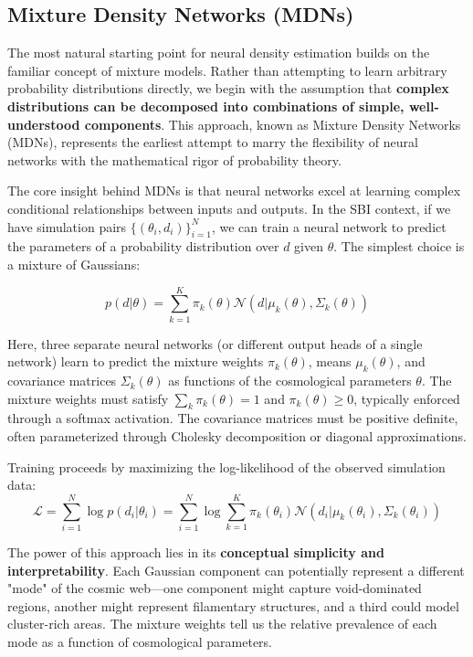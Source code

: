 \documentclass{SciPost}
\begin{document}
\subsection{Mixture Density Networks (MDNs)}

The most natural starting point for neural density estimation builds on the familiar concept of mixture models. Rather than attempting to learn arbitrary probability distributions directly, we begin with the assumption that \textbf{complex distributions can be decomposed into combinations of simple, well-understood components}. This approach, known as Mixture Density Networks (MDNs), represents the earliest attempt to marry the flexibility of neural networks with the mathematical rigor of probability theory.

The core insight behind MDNs is that neural networks excel at learning complex conditional relationships between inputs and outputs. In the SBI context, if we have simulation pairs $\{(\theta_i, d_i)\}_{i=1}^N$, we can train a neural network to predict the parameters of a probability distribution over $d$ given $\theta$. The simplest choice is a mixture of Gaussians:

\begin{equation}
    p(d|\theta) = \sum_{k=1}^K \pi_k(\theta) \mathcal{N}(d | \mu_k(\theta), \Sigma_k(\theta))
\end{equation}

Here, three separate neural networks (or different output heads of a single network) learn to predict the mixture weights $\pi_k(\theta)$, means $\mu_k(\theta)$, and covariance matrices $\Sigma_k(\theta)$ as functions of the cosmological parameters $\theta$. The mixture weights must satisfy $\sum_k \pi_k(\theta) = 1$ and $\pi_k(\theta) \geq 0$, typically enforced through a softmax activation. The covariance matrices must be positive definite, often parameterized through Cholesky decomposition or diagonal approximations.

Training proceeds by maximizing the log-likelihood of the observed simulation data:
\begin{equation}
    \mathcal{L} = \sum_{i=1}^N \log p(d_i|\theta_i) = \sum_{i=1}^N \log \sum_{k=1}^K \pi_k(\theta_i) \mathcal{N}(d_i | \mu_k(\theta_i), \Sigma_k(\theta_i))
\end{equation}

The power of this approach lies in its \textbf{conceptual simplicity and interpretability}. Each Gaussian component can potentially represent a different "mode" of the cosmic web—one component might capture void-dominated regions, another might represent filamentary structures, and a third could model cluster-rich areas. The mixture weights tell us the relative prevalence of each mode as a function of cosmological parameters.
\end{document}
